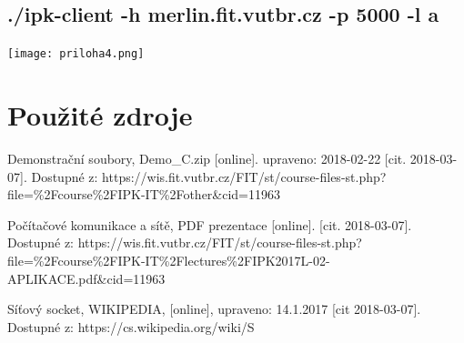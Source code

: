 \documentclass[11pt]{article}
\begin{document}
	\subsection{./ipk-client -h merlin.fit.vutbr.cz -p 5000 -l a}
	\begin{center}
		\texttt{[image: priloha4.png]}\\
	\end{center}
	

	
	\vfill
	
	\section{Použité zdroje}
	\begin{flushleft}
		[1] Demonstrační soubory, Demo\_C.zip [online]. upraveno: 2018-02-22 [cit. 2018-03-07]. Dostupné z: https://wis.fit.vutbr.cz/FIT/st/course-files-st.php?file=\%2Fcourse\%2FIPK-IT\%2Fother\&cid=11963\par	
	\end{flushleft}	
	\begin{flushleft}
		[2] Počítačové komunikace a sítě, PDF prezentace [online]. [cit. 2018-03-07]. Dostupné z: https://wis.fit.vutbr.cz/FIT/st/course-files-st.php?file=\%2Fcourse\%2FIPK-IT\%2Flectures\%2FIPK2017L-02-APLIKACE.pdf\&cid=11963\par	
	\end{flushleft}
	\begin{flushleft}
		[3] Síťový socket, WIKIPEDIA, [online], upraveno: 14.1.2017 [cit 2018-03-07]. Dostupné z: https://cs.wikipedia.org/wiki/S%
	\end{flushleft}
\end{document}

